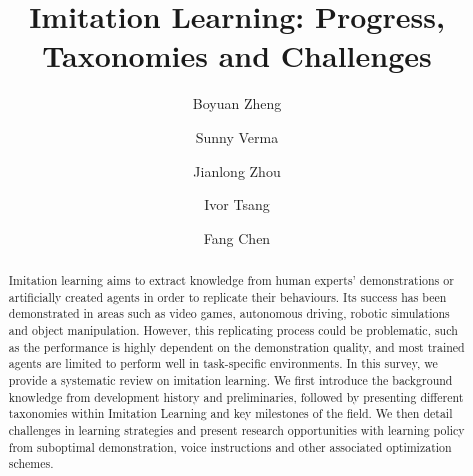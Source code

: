\documentclass[acmsmall]{acmart}
\begin{document}
\title{Imitation Learning: Progress, Taxonomies and Challenges}

\author{Boyuan Zheng}


\author{Sunny Verma}
\author{Jianlong Zhou}
\author{Ivor Tsang}
\author{Fang Chen}




\renewcommand{\shortauthors}{Boyuan et. al.}

\begin{abstract}
Imitation learning aims to extract knowledge from human experts' demonstrations or artificially created agents in order to replicate their behaviours. Its success has been demonstrated in areas such as video games, autonomous driving, robotic simulations and object manipulation. However, this replicating process could be problematic, such as the performance is highly dependent on the demonstration quality, and most trained agents are limited to perform well in task-specific environments. In this survey, we provide a systematic review on imitation learning. We first introduce the background knowledge from development history and preliminaries, followed by presenting different taxonomies within Imitation Learning and key milestones of the field. We then detail challenges in learning strategies and present research opportunities with learning policy from suboptimal demonstration, voice instructions and other associated optimization schemes.
\end{abstract}
\end{document}
